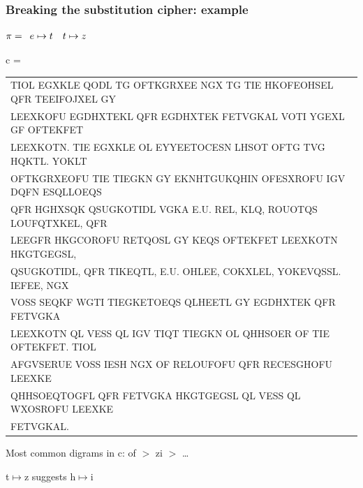 \documentclass[aspectratio=169, lualatex, 10pt,dvipsnames,svgnames]{beamer} %
\def\enbleu#1{\textcolor{bleu}{#1}}
\def\enrouge#1{\textcolor{rouge}{#1}}
\begin{document}
\begin{frame}
  \frametitle{Breaking the substitution cipher: example}

    \enrouge{
    \tiny{$\pi=
      \begin{array}[t]{l}
       e\mapsto t\quad t\mapsto z
      \end{array}
      $}}
  \vspace{0.25cm}
  
  \color{vert}
  \tiny{c =
    \begin{tabular}[t]{l}
      \enbleu{T}IOL EGXKL\enbleu{E} QODL \enbleu{T}G OF\enbleu{T}KGRXE\enbleu{E} NGX \enbleu{T}G \enbleu{T}I\enbleu{E} HKOFEOHS\enbleu{E}L QFR \enbleu{T}\enbleu{E}EIFOJX\enbleu{E}L GY \\
      L\enbleu{E}EXKOFU EGDHX\enbleu{T}\enbleu{E}KL QFR EGDHX\enbleu{T}\enbleu{E}K F\enbleu{E}\enbleu{T}VGKAL VO\enbleu{T}I YGEXL GF OF\enbleu{T}\enbleu{E}KF\enbleu{E}\enbleu{T} \\
      L\enbleu{E}EXKO\enbleu{T}N. \enbleu{T}I\enbleu{E} EGXKL\enbleu{E} OL \enbleu{E}YY\enbleu{E}E\enbleu{T}OC\enbleu{E}SN LHSO\enbleu{T} OF\enbleu{T}G \enbleu{T}VG HQK\enbleu{T}L. YOKL\enbleu{T} \\
      OF\enbleu{T}KGRXEOFU \enbleu{T}I\enbleu{E} \enbleu{T}I\enbleu{E}GKN GY EKNH\enbleu{T}GUKQHIN OFESXROFU IGV DQFN ESQLLOEQS \\
      QFR HGHXSQK QSUGKO\enbleu{T}IDL VGKA \enbleu{E}.U. R\enbleu{E}L, KLQ, ROUO\enbleu{T}QS LOUFQ\enbleu{T}XK\enbleu{E}L, QFR \\
      L\enbleu{E}EGFR HKGCOROFU R\enbleu{E}\enbleu{T}QOSL GY K\enbleu{E}QS OF\enbleu{T}\enbleu{E}KF\enbleu{E}\enbleu{T} L\enbleu{E}EXKO\enbleu{T}N HKG\enbleu{T}GEGSL, \\
      QSUGKO\enbleu{T}IDL, QFR \enbleu{T}IK\enbleu{E}Q\enbleu{T}L, \enbleu{E}.U. OHL\enbleu{E}E, COKXL\enbleu{E}L, YOK\enbleu{E}VQSSL. I\enbleu{E}FE\enbleu{E}, NGX \\
      VOSS S\enbleu{E}QKF WG\enbleu{T}I \enbleu{T}I\enbleu{E}GK\enbleu{E}\enbleu{T}OEQS QLH\enbleu{E}E\enbleu{T}L GY EGDHX\enbleu{T}\enbleu{E}K QFR F\enbleu{E}\enbleu{T}VGKA \\
      L\enbleu{E}EXKO\enbleu{T}N QL V\enbleu{E}SS QL IGV \enbleu{T}IQ\enbleu{T} \enbleu{T}I\enbleu{E}GKN OL QHHSO\enbleu{E}R OF \enbleu{T}I\enbleu{E} OF\enbleu{T}\enbleu{E}KF\enbleu{E}\enbleu{T}. \enbleu{T}IOL \\
      AFGVS\enbleu{E}RU\enbleu{E} VOSS I\enbleu{E}SH NGX OF R\enbleu{E}LOUFOFU QFR R\enbleu{E}C\enbleu{E}SGHOFU L\enbleu{E}EXK\enbleu{E} \\
      QHHSOEQ\enbleu{T}OGFL QFR F\enbleu{E}\enbleu{T}VGKA HKG\enbleu{T}GEGSL QL V\enbleu{E}SS QL WXOSROFU L\enbleu{E}EXK\enbleu{E} \\
      F\enbleu{E}\enbleu{T}VGKAL.
    \end{tabular}
  }
  \vspace{0.5cm}

  \normalsize
  \color{black}Most common digrams in c: of $>$ zi $>$ \dots
  
  \pause

  t$\mapsto$z suggests h$\mapsto$i

  \color{black}
\end{frame}
\end{document}
